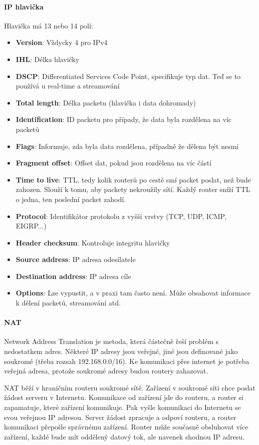\paragraph{IP hlavička} Hlavička má 13 nebo 14 polí:
\begin{itemize}
\item \textbf{Version}: Vždycky 4 pro IPv4
\item \textbf{IHL}: Délka hlavičky
\item \textbf{DSCP}: Differentiated Services Code Point, specifikuje typ dat. Teď se to používá u real-time a streamování
\item \textbf{Total length}: Délka packetu (hlavička i data dohromady)
\item \textbf{Identification}: ID packetu pro případy, že data byla rozdělena na víc packetů
\item \textbf{Flags}: Informuje, zda byla data rozdělena, případně že dělena být nesmí
\item \textbf{Fragment offset}: Offset dat, pokud jsou rozdělena na víc částí
\item \textbf{Time to live}: TTL, tedy kolik routerů po cestě smí packet poslat, než bude zahozen. Slouží k tomu, aby packety nekroužily sítí. Každý router sníží TTL o jedna, ten poslední packet zahodí.
\item \textbf{Protocol}: Identifikátor protokolu z vyšší vrstvy (TCP, UDP, ICMP, EIGRP...)
\item \textbf{Header checksum}: Kontroluje integritu hlavičky
\item \textbf{Source address}: IP adresa odesílatele
\item \textbf{Destination address}: IP adresa cíle
\item \textbf{Options}: Lze vypustit, a v praxi tam často není. Může obsahovat informace k dělení packetů, streamování atd. 
\end{itemize}

\paragraph{NAT} Network Address Translation je metoda, která částečně řeší problém s nedostatkem adres. Některé IP adresy jsou veřejné, jiné jsou definované jako soukromé (třeba rozsah 192.168.0.0/16). Ke komunikaci přes internet je potřeba veřejná adresa, protože soukromé adresy budou routery zahazovat.

NAT běží v hraničním routeru soukromé sítě. Zařízení v soukromé síti chce poslat žádost serveru v Internetu. Komunikace od zařízení jde do routeru, a router si zapamatuje, které zařízení komunikuje. Pak vyšle komunikaci do Internetu se svou veřejnou IP adresou. Server žádost zpracuje a odpoví routeru, a router komunikaci přepošle správnému zařízení. Router může současně obsluhovat více zařízení, každé bude mít oddělený datový tok, ale navenek shodnou IP adresu.

